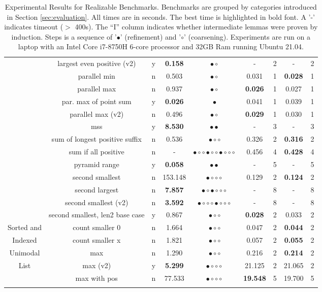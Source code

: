 {\begin{longtable}[h]{|c|c|c|c|c||c|c||c|c|}
         & largest even positive (v2) & y & {\bf 0.158} & $\bullet\circ$ & -  & 2 & - & 2 \\ 
         & parallel min & n &  0.503 & $\bullet\circ$ &  0.031  & 1 & {\bf 0.028} & 1 \\ 
         & parallel max & n &  0.937 & $\bullet\circ$ & {\bf 0.026}  & 1 &  0.027 & 1 \\ 
         & par. max of point sum & y & {\bf 0.026} & $\bullet$ &  0.041  & 1 &  0.039 & 1 \\ 
         & parallel max (v2) & n &  0.496 & $\bullet\circ$ & {\bf 0.029}  & 1 &  0.030 & 1 \\ 
         & mss & y & {\bf 8.530} & $\bullet\bullet$ & -  & 3 & - & 3 \\ 
         & sum of longest positive suffix & n &  0.536 & $\bullet\circ\circ$ &  0.326  & 2 & {\bf 0.316} & 2 \\ 
         & sum if all positive & n & - & $\bullet\circ\circ\bullet\circ\circ\bullet\circ\circ\circ$ &  0.456  & 4 & {\bf 0.428} & 4 \\ 
         & pyramid range & y & {\bf 0.058} & $\bullet\bullet$ & -  & 5 & - & 5 \\ 
         & second smallest & n &  153.148 & $\bullet\circ\circ\circ$ &  0.129  & 2 & {\bf 0.124} & 2 \\ 
         & second largest & n & {\bf 7.857} & $\bullet\circ\bullet\circ\circ\circ$ & -  & 8 & - & 8 \\ 
         & second smallest (v2) & n & {\bf 3.592} & $\bullet\circ\circ\circ\bullet\circ\circ\circ$ & -  & 8 & - & 8 \\ 
         & second smallest, len2 base case & y &  0.867 & $\bullet\circ\circ$ & {\bf 0.028}  & 2 &  0.033 & 2 \\ 
			\hline
 Sorted and  & count smaller 0 & n &  1.664 & $\bullet\circ\circ$ &  0.047  & 2 & {\bf 0.044} & 2 \\ 
 Indexed      & count smaller x & n &  1.821 & $\bullet\circ\circ$ &  0.057  & 2 & {\bf 0.055} & 2 \\ 
			\hline
Unimodal   & max & n &  1.290 & $\bullet\circ\circ$ &  0.216  & 2 & {\bf 0.214} & 2 \\ 
List  & max (v2) & y & {\bf 5.299} & $\bullet\circ\circ\circ$ &  21.125  & 2 &  21.065 & 2 \\ 
     & max with pos & n &  77.533 & $\bullet\circ\circ\circ$ & {\bf 19.548}  & 5 &  19.700 & 5 \\ 
			\hline
	\caption{Experimental Results for Realizable Benchmarks.  Benchmarks are grouped by categories introduced in Section \ref{sec:evaluation}. All times are in seconds. The best time is highlighted in bold font.  A '-' indicates timeout ($>$ 400s). The ``I'' column indicates whether intermediate lemmas were proven by induction. Steps is a sequence of '$\bullet$' (refinement) and '$\circ$' (coarsening). Experiments are run on a laptop with an Intel Core i7-8750H 6-core processor and 32GB Ram running Ubuntu 21.04.}\label{table:experiments}
		\end{longtable}
	}

